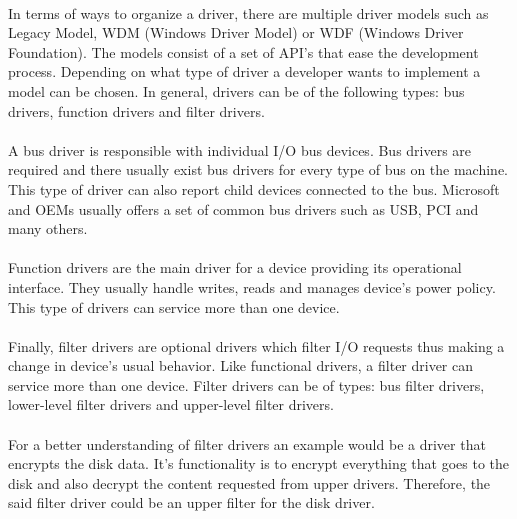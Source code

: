 	   	\paragraph{}
	   	In terms of ways to organize a driver, there are multiple driver models such as Legacy Model, WDM (Windows Driver Model) or WDF (Windows Driver Foundation). The models consist of a set of API's that ease the development process. Depending on what type of driver a developer wants to implement a model can be chosen. In general, drivers can be of the following types: bus drivers, function drivers and filter drivers. 
	   	
	   	\paragraph{}
	   	A bus driver is responsible with individual I/O bus devices. Bus drivers are required and there usually exist bus drivers for every type of bus on the machine. This type of driver can also report child devices connected to the bus. Microsoft and OEMs usually offers a set of common bus drivers such as USB, PCI and many others. \cite{MSDNWDMDrivers}
	   	
	   	\paragraph{}
	   	Function drivers are the main driver for a device providing its operational interface. They usually handle writes, reads and manages device's power policy. This type of drivers can service more than one device. \cite{MSDNWDMDrivers}
	   
	   	\paragraph{}
	   	Finally, filter drivers are optional drivers which filter I/O requests thus making a change in device's usual behavior. Like functional drivers, a filter driver can service more than one device. Filter drivers can be of types: bus filter drivers, lower-level filter drivers and upper-level filter drivers. \cite{MSDNWDMDrivers}
	   
	   	\paragraph{}
	   	For a better understanding of filter drivers an example would be a driver that encrypts the disk data. It's functionality is to encrypt everything that goes to the disk and also decrypt the content requested from upper drivers. Therefore, the said filter driver could be an upper filter for the disk driver.
	   
